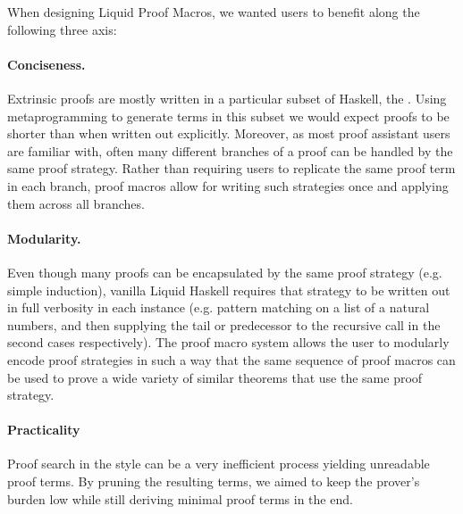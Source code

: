 

When designing Liquid Proof Macros, we wanted users to benefit along the following three axis:

\paragraph{Conciseness.}
%
Extrinsic proofs are mostly written in a particular subset of Haskell,
the \LangB. Using metaprogramming to generate terms in this subset we
would expect proofs to be shorter than when written out explicitly.
%
%
Moreover, as most proof assistant users are familiar with, often many
different branches of a proof can be handled by the same proof
strategy. Rather than requiring users to replicate the same proof term
in each branch, proof macros allow for writing such strategies once
and applying them across all branches.

\paragraph{Modularity.}
%
Even though many proofs can be encapsulated by the same proof strategy
(e.g. simple induction), vanilla Liquid Haskell requires that strategy
to be written out in full verbosity in each instance (e.g.  pattern
matching on a list of a natural numbers, and then supplying the tail
or predecessor to the recursive call in the second cases
respectively). The proof macro system allows the user to modularly
encode proof strategies in such a way that the same sequence of proof
macros can be used to prove a wide variety of similar theorems that
use the same proof strategy.

\paragraph{Practicality}
%
Proof search in the style can be a very inefficient process yielding
unreadable proof terms. By pruning the resulting terms, we aimed to
keep the prover's burden low while still deriving minimal proof terms
in the end.

